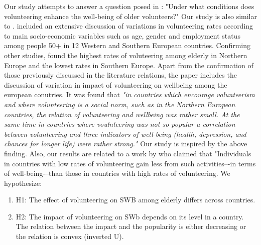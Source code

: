 \documentclass[10pt, letterpaper]{article}
\begin{document}
\begin{spacing}{1.4}
Our study attempts to answer a question posed in \citet{morrow10}: "Under what conditions does volunteering enhance the well-being of older volunteers?" Our study is also similar to \citet{haski09}. \citet{haski09} included an extensive discussion of variations in volunteering rates according to main socio-economic variables such as age, gender and employment status among people  50+  in 12 Western and Southern European countries. Confirming other studies, \citet{haski09} found the highest rates of voluteering among elderly in Northern Europe and the lowest rates in Southern Europe. Apart from the confirmation of those previously discussed in the literature relations, the paper includes the discussion of variation in impact of volunteering on wellbeing among the european conutries. It was found that \textit{"in countries which encourage volunteerism and where volunteering is a social norm, such as in the Northern European countries, the relation of volunteering and wellbeing was rather small. At the same time in countries where voulnteering was not so popular  a correlation between volunteering and three indicators of well-being (health, depression, and chances for longer life) were rather strong."}  Our study is inspired by the above finding. Also, our results are related to a work by \citet{plagnol10} who claimed that "Individuals in countries with low rates of volunteering gain less from such activities–-in terms of well-being-–than those in countries with high rates of volunteering. We hypothesize: \\

\begin{enumerate}
\item H1: The effect of volunteering on SWB among elderly differs across countries.  
\item H2: The impact of volunteering on SWb depends on its level in a country. The relation between the impact and the popularity is either decreasing or the relation is convex (inverted U).
\end{enumerate}


\end{spacing}
\end{document}
